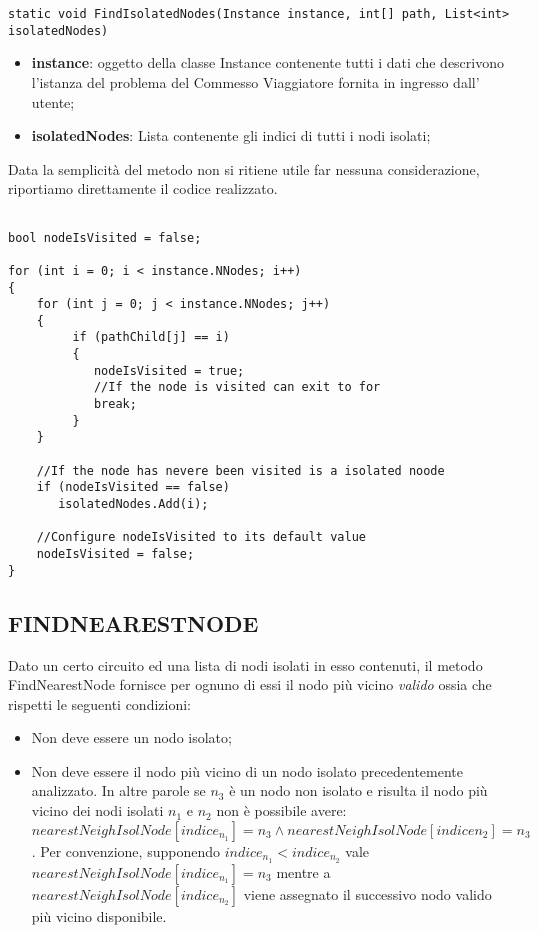 \documentclass[11pt]{article}
\begin{document}
\begin{lstlisting}
static void FindIsolatedNodes(Instance instance, int[] path, List<int> isolatedNodes)
\end{lstlisting}

\begin{itemize}
    \item \textbf{instance}: oggetto della classe Instance contenente tutti i dati che descrivono l'istanza del problema del Commesso Viaggiatore fornita in ingresso dall' utente;
    \item \textbf{isolatedNodes}: Lista contenente gli indici di tutti i nodi isolati;
\end{itemize}

Data la semplicità del metodo non si ritiene utile far nessuna considerazione, riportiamo direttamente il codice realizzato.

\begin{lstlisting}

bool nodeIsVisited = false;

for (int i = 0; i < instance.NNodes; i++)
{
    for (int j = 0; j < instance.NNodes; j++)
    {
         if (pathChild[j] == i)
         {
            nodeIsVisited = true;
            //If the node is visited can exit to for
            break;
         }
    }

    //If the node has nevere been visited is a isolated noode
    if (nodeIsVisited == false)
       isolatedNodes.Add(i);

    //Configure nodeIsVisited to its default value
    nodeIsVisited = false;
}

\end{lstlisting}

\subsection*{FINDNEARESTNODE}
\label{sec:FindNearestNodeS}

Dato un certo circuito ed una lista di nodi isolati in esso contenuti, il metodo FindNearestNode fornisce per ognuno di essi il nodo più vicino \textit{valido} ossia che rispetti le seguenti condizioni:

\begin{itemize}
    \item  Non deve essere un nodo isolato;
    \item  Non deve essere il nodo più vicino di un nodo isolato precedentemente analizzato. In altre parole se $n_3$ è un nodo non isolato e risulta il nodo più vicino dei nodi isolati $n_1$ e $n_2$ non è possibile avere: $nearestNeighIsolNode[indice_{n_1}] = n_3 \wedge nearestNeighIsolNode[indice{n_2}] = n_3$. Per convenzione, supponendo $indice_{n_1} < indice_{n_2}$ vale $nearestNeighIsolNode[indice_{n_1}] = n_3$ mentre a $nearestNeighIsolNode[indice_{n_2}]$ viene assegnato il successivo nodo valido più vicino disponibile.
\end{itemize}
\end{document}
